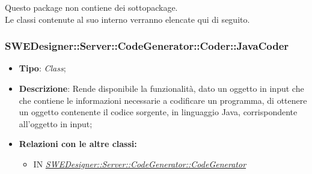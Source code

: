 \documentclass[../SpecificaTecnica.tex]{subfiles}
\begin{document}
			Questo package non contiene dei sottopackage.\\
			Le classi contenute al suo interno verranno elencate qui di seguito.
			
			
			\subsubsection{SWEDesigner::Server::CodeGenerator::Coder::JavaCoder}
			\hypertarget{SWEDesigner::Server::CodeGenerator::Coder::JavaCoder}{}
			\begin{itemize}
				\item \textbf{Tipo}: \emph{Class};
				\item \textbf{Descrizione}: Rende disponibile la funzionalità, dato un oggetto in input che che contiene le informazioni necessarie a codificare un programma, di ottenere un oggetto contenente il codice sorgente, in linguaggio Java, corrispondente all'oggetto in input;
				\item \textbf{Relazioni con le altre classi:}
				\begin{itemize}
					\item IN \hyperlink{SWEDesigner::Server::CodeGenerator::CodeGenerator}{\emph{SWEDesigner::Server::CodeGenerator::CodeGenerator}}
				\end{itemize}	
			\end{itemize}
			
\end{document}

